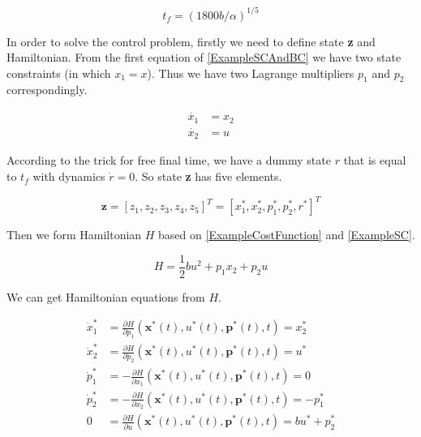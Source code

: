 \documentclass[twoside]{article}
\begin{document}
\begin{equation}\label{ExampleAnalyticalSolution}
t_f = (1800b/\alpha)^{1/5}
\end{equation}

In order to solve the control problem, firstly we need to define state \textbf{z} and Hamiltonian. From the first equation of \eqref{ExampleSCAndBC} we have two state constraints (in which $x_1 = x$). Thus we have two Lagrange multipliers $p_1$ and $p_2$ correspondingly.

\begin{equation}\label{ExampleSC}%
\begin{split}
\dot{x_1} &= x_2 \\
\dot{x_2} &= u
\end{split}
\end{equation}

According to the trick for free final time, we have a dummy state $r$ that is equal to $t_f$ with dynamics $\dot{r} = 0$. So state \textbf{z} has five elements.

\begin{equation}\label{ExampleState}
\textbf{z} = [z_1, z_2, z_3, z_4, z_5] ^T= [x_1^*, x_2^*, p_1^*, p_2^*, r^*]^T
\end{equation}

Then we form Hamiltonian $H$ based on \eqref{ExampleCostFunction} and \eqref{ExampleSC}.

\begin{equation}\label{ExampleH}
H = \frac{1}{2}bu^2 + p_1x_2 + p_2u
\end{equation}

We can get Hamiltonian equations from $H$.

\begin{equation}\label{ExampleHEqs}
\begin{split}
\dot{x}_1^* &= \frac{\partial{H}}{\partial{p_1}}(\textbf{x}^*(t),u^*(t),\textbf{p}^*(t),t)= x_2^* \\
\dot{x}_2^* &= \frac{\partial{H}}{\partial{p_2}}(\textbf{x}^*(t),u^*(t),\textbf{p}^*(t),t)= u^* \\
\dot{p}_1^* &= -\frac{\partial{H}}{\partial{x_1}}(\textbf{x}^*(t),u^*(t),\textbf{p}^*(t),t)= 0 \\
\dot{p}_2^* &= -\frac{\partial{H}}{\partial{x_2}}(\textbf{x}^*(t),u^*(t),\textbf{p}^*(t),t)=-p_1^* \\
0 &= \frac{\partial{H}}{\partial{u}}(\textbf{x}^*(t),u^*(t),\textbf{p}^*(t),t) = bu^* + p_2^*
\end{split}
\end{equation}
\end{document}
